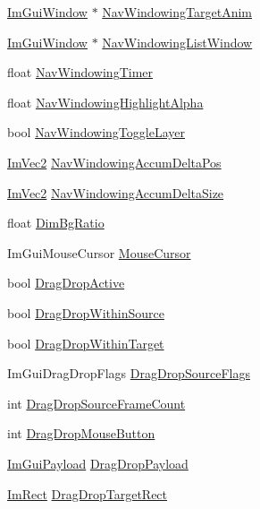 \begin{DoxyCompactItemize}
\hyperlink{structImGuiWindow}{Im\+Gui\+Window} $\ast$ \hyperlink{structImGuiContext_aaaf83b57ad918ef20a653bc8f5dbcde7}{Nav\+Windowing\+Target\+Anim}
\item 
\hyperlink{structImGuiWindow}{Im\+Gui\+Window} $\ast$ \hyperlink{structImGuiContext_aa9d5283b6d3fc1d02d8dd75debe735f7}{Nav\+Windowing\+List\+Window}
\item 
float \hyperlink{structImGuiContext_a412d61294f8c686db6ecc366c845bd08}{Nav\+Windowing\+Timer}
\item 
float \hyperlink{structImGuiContext_a58906b21765f83b753e33b4733fa596c}{Nav\+Windowing\+Highlight\+Alpha}
\item 
bool \hyperlink{structImGuiContext_a324b59dc38e7121a1aef959218d3563a}{Nav\+Windowing\+Toggle\+Layer}
\item 
\hyperlink{structImVec2}{Im\+Vec2} \hyperlink{structImGuiContext_a6f84faac2ec580ffb83bf9f20e04a1ba}{Nav\+Windowing\+Accum\+Delta\+Pos}
\item 
\hyperlink{structImVec2}{Im\+Vec2} \hyperlink{structImGuiContext_ab9e19fbe32a73581cbad3f93b631f3b2}{Nav\+Windowing\+Accum\+Delta\+Size}
\item 
float \hyperlink{structImGuiContext_af5761a79ad40a0b0fbdb1376ce0af4a1}{Dim\+Bg\+Ratio}
\item 
Im\+Gui\+Mouse\+Cursor \hyperlink{structImGuiContext_ab60730c7f9f601fd0b22dac060a822e3}{Mouse\+Cursor}
\item 
bool \hyperlink{structImGuiContext_a2de4fe755e10ccfee6b06aa84b3d9c0d}{Drag\+Drop\+Active}
\item 
bool \hyperlink{structImGuiContext_a5e6e55130cd0bdf76fd716b767e15046}{Drag\+Drop\+Within\+Source}
\item 
bool \hyperlink{structImGuiContext_abb22625c9c2f9b3b339c2ea696def2bb}{Drag\+Drop\+Within\+Target}
\item 
Im\+Gui\+Drag\+Drop\+Flags \hyperlink{structImGuiContext_a61d6d8dbd670e2f4e70d50248caac012}{Drag\+Drop\+Source\+Flags}
\item 
int \hyperlink{structImGuiContext_a03bca20dc62ae39fb6c7eb047babf12c}{Drag\+Drop\+Source\+Frame\+Count}
\item 
int \hyperlink{structImGuiContext_a0efbd88ee7334cb922fccb1487ba496c}{Drag\+Drop\+Mouse\+Button}
\item 
\hyperlink{structImGuiPayload}{Im\+Gui\+Payload} \hyperlink{structImGuiContext_a35f39762769e30c083758c21fbde3e78}{Drag\+Drop\+Payload}
\item 
\hyperlink{structImRect}{Im\+Rect} \hyperlink{structImGuiContext_a9c0b11750492d186c9b96b75d824e91b}{Drag\+Drop\+Target\+Rect}

\end{DoxyCompactItemize}
